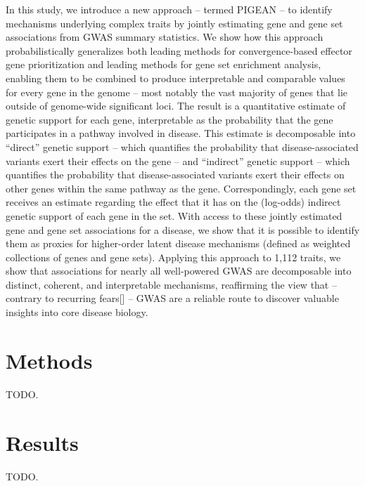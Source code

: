 \documentclass[sn-nature]{sn-jnl}%
\theoremstyle{thmstyleone}%
\theoremstyle{thmstyletwo}%
\theoremstyle{thmstylethree}%
\begin{document}
In this study, we introduce a new approach – termed PIGEAN – to identify mechanisms underlying complex traits by jointly estimating gene and gene set associations from GWAS summary statistics. We show how this approach probabilistically generalizes both leading methods for convergence-based effector gene prioritization and leading methods for gene set enrichment analysis, enabling them to be combined to produce interpretable and comparable values for every gene in the genome – most notably the vast majority of genes that lie outside of genome-wide significant loci. The result is a quantitative estimate of genetic support for each gene, interpretable as the probability that the gene participates in a pathway involved in disease. This estimate is decomposable into “direct” genetic support – which quantifies the probability that disease-associated variants exert their effects on the gene – and “indirect” genetic support – which quantifies the probability that disease-associated variants exert their effects on other genes within the same pathway as the gene. Correspondingly, each gene set receives an estimate regarding the effect that it has on the (log-odds) indirect genetic support of each gene in the set. With access to these jointly estimated gene and gene set associations for a disease, we show that it is possible to identify them as proxies for higher-order latent disease mechanisms (defined as weighted collections of genes and gene sets). Applying this approach to 1,112 traits, we show that associations for nearly all well-powered GWAS are decomposable into distinct, coherent, and interpretable mechanisms, reaffirming the view that –  contrary to recurring fears[] – GWAS are a reliable route to discover valuable insights into core disease biology.

\section{Methods}\label{sec:methods}
TODO.

\section{Results}\label{sec:results}
TODO.
\end{document}
